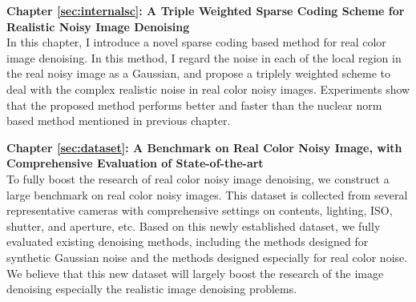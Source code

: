 \textbf{Chapter \ref{sec:internalsc}: A Triple Weighted Sparse Coding Scheme for Realistic Noisy Image Denoising} \\[0.2em]

In this chapter, I introduce a novel sparse coding based method for real color image denoising. In this method, I regard the noise in each of the local region in the real noisy image as a Gaussian, and propose a triplely weighted scheme to deal with the complex realistic noise in real color noisy images. Experiments show that the proposed method performs better and faster than the nuclear norm based method mentioned in previous chapter.


\textbf{Chapter \ref{sec:dataset}: A Benchmark on Real Color Noisy Image, with Comprehensive Evaluation of State-of-the-art} \\[0.2em]

To fully boost the research of real color noisy image denoising, we construct a large benchmark on real color noisy images. This dataset is collected from several representative cameras with comprehensive settings on contents, lighting, ISO, shutter, and aperture, etc. Based on this newly established dataset, we fully evaluated existing denoising methods, including the methods designed for synthetic Gaussian noise and the methods designed especially for real color noise. We believe that this new dataset will largely boost the research of the image denoising especially the realistic image denoising problems.





